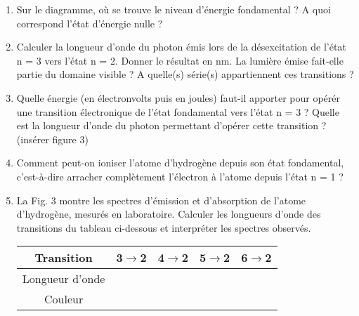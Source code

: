 \documentclass{article}
\begin{document}
\begin{enumerate}
    \item Sur le diagramme, où se trouve le niveau d’énergie fondamental ? A quoi correspond l’état d’énergie nulle ?
    \item Calculer la longueur d’onde du photon émis lors de la désexcitation de l’état n = 3 vers l’état n = 2. Donner le résultat en nm. La lumière émise fait-elle partie du domaine visible ? A quelle(s) série(s) appartiennent ces transitions ?
    \item Quelle énergie (en électronvolts puis en joules) faut-il apporter pour opérér une transition électronique de l’état fondamental vers l’état n = 3 ? Quelle est la longueur d’onde du photon permettant d’opérer cette transition ? (insérer figure 3)
    \item Comment peut-on ioniser l’atome d’hydrogène depuis son état fondamental, c’est-à-dire arracher complètement l’électron à l’atome depuis l’état n = 1 ?
    \item La Fig. 3 montre les spectres d’émission et d’absorption de l’atome d’hydrogène, mesurés en laboratoire. Calculer les longueurs d’onde des transitions du tableau ci-dessous et interpréter les spectres observés.
    \begin{center}
        \begin{tabular}{|c|c|c|c|c|}
            \hline
            Transition & 3$\rightarrow$2 & 4$\rightarrow$2 & 5$\rightarrow$2 & 6$\rightarrow$2 \\
            \hline
            Longueur d'onde & & & & \\
            \hline
            Couleur & & & & \\
            \hline
        \end{tabular}
    \end{center}
\end{enumerate}
\end{document}
